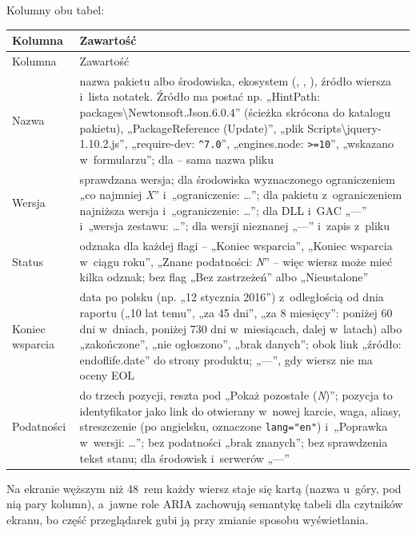 Kolumny obu tabel:

\begin{xltabular}{\linewidth}{@{}>{\raggedright\arraybackslash}p{2.6cm} >{\raggedright\arraybackslash}X@{}}
\toprule
Kolumna & Zawartość \\
\midrule
\endfirsthead
\toprule
Kolumna & Zawartość \\
\midrule
\endhead
Nazwa & nazwa pakietu albo środowiska, ekosystem (, , ), źródło wiersza i~lista notatek. Źródło ma postać np. „HintPath: packages\textbackslash Newtonsoft.Json.6.0.4” (ścieżka skrócona do katalogu pakietu), „PackageReference (Update)”, „plik Scripts\textbackslash jquery-1.10.2.js”, „require-dev: \texttt{\textasciicircum 7.0}”, „engines.node: \texttt{>=10}”, „wskazano w~formularzu”; dla  -- sama nazwa pliku \\
Wersja & sprawdzana wersja; dla środowiska wyznaczonego ograniczeniem „co najmniej \emph{X}” i~„ograniczenie: …”; dla pakietu z~ograniczeniem najniższa wersja i~„ograniczenie: …”; dla DLL i~GAC „---” i~„wersja zestawu: …”; dla wersji nieznanej „---” i~zapis z~pliku \\
Status & odznaka dla każdej flagi -- „Koniec wsparcia”, „Koniec wsparcia w~ciągu roku”, „Znane podatności: \emph{N}” -- więc wiersz może mieć kilka odznak; bez flag „Bez zastrzeżeń” albo „Nieustalone” \\
Koniec wsparcia & data po polsku (np. „12 stycznia 2016”) z~odległością od dnia raportu („10 lat temu”, „za 45 dni”, „za 8 miesięcy”: poniżej 60 dni w~dniach, poniżej 730 dni w~miesiącach, dalej w~latach) albo „zakończone”, „nie ogłoszono”, „brak danych”; obok link „źródło: endoflife.date” do strony produktu; „---”, gdy wiersz nie ma oceny EOL \\
Podatności & do trzech pozycji, reszta pod „Pokaż pozostałe (\emph{N})”; pozycja to identyfikator jako link do  otwierany w~nowej karcie, waga, aliasy, streszczenie (po angielsku, oznaczone \texttt{lang="en"}) i~„Poprawka w~wersji: …”; bez podatności „brak znanych”; bez sprawdzenia tekst stanu; dla środowisk i~serwerów „---” \\
\bottomrule
\end{xltabular}

Na ekranie węższym niż 48~rem każdy wiersz staje się kartą (nazwa u~góry, pod nią pary
kolumn), a~jawne role ARIA zachowują semantykę tabeli dla czytników ekranu, bo część
przeglądarek gubi ją przy zmianie sposobu wyświetlania.


